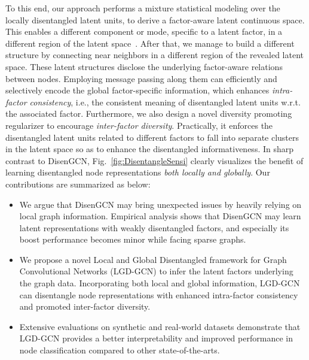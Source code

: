 \documentclass[accepted]{uai2021} %
\begin{document}
To this end, our approach performs a mixture statistical modeling over the locally disentangled latent units, to derive a factor-aware latent continuous space. This enables a different component or mode, specific to a latent factor, in a different region of the latent space~\citep{Ghahramani1996TheEA}. After that, we manage to build a different structure by connecting near neighbors in a different region of the revealed latent space. These latent structures disclose the underlying factor-aware relations between nodes. Employing message passing along them can efficiently and selectively encode the global factor-specific information, which enhances \emph{intra-factor consistency}, i.e., the consistent meaning of disentangled latent units  w.r.t. the associated factor. Furthermore, we also design a novel diversity promoting regularizer to encourage \emph{inter-factor diversity}. Practically, it enforces the disentangled latent units related to different factors to fall into separate clusters in the latent space so as to enhance the disentangled informativeness. In sharp contrast to DisenGCN, Fig.~\ref{fig:DisentangleSensi} clearly visualizes the benefit of learning disentangled node representations \emph{both locally and globally}. Our contributions are summarized as below:
\begin{itemize}[noitemsep,nolistsep]
    \item We argue that DisenGCN may bring unexpected issues by heavily relying on local graph information. Empirical analysis shows that DisenGCN may learn latent representations with weakly disentangled factors, and especially its boost performance becomes minor while facing sparse graphs.
    \item We propose a novel Local and Global Disentangled framework for Graph Convolutional Networks (LGD-GCN) to infer the latent factors underlying the graph data. Incorporating both local and global information, LGD-GCN can disentangle node representations with enhanced intra-factor consistency and promoted inter-factor diversity.
    \item Extensive evaluations on synthetic and real-world datasets demonstrate that LGD-GCN provides a better interpretability and improved performance in node classification compared to other state-of-the-arts.
\end{itemize}
\end{document}
